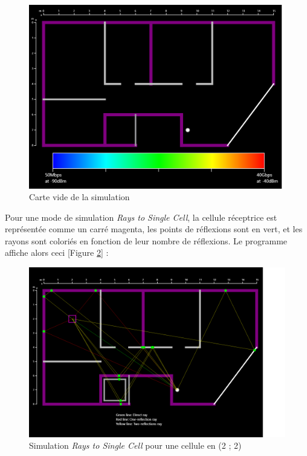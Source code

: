 \begin{figure}[H]
    \centering
    \includegraphics[width=\textwidth]{latex/images/blank_map.png}
    \caption{Carte vide de la simulation}
    \label{fig:blank-map}
\end{figure}

Pour une mode de simulation \textit{Rays to Single Cell}, la cellule réceptrice est représentée comme un carré magenta, les points de réflexions sont en vert, et les rayons sont coloriés en fonction de leur nombre de réflexions. Le programme affiche alors ceci [Figure \ref{fig:simu-single-cell}] :
\begin{figure}[H]
    \centering
    \includegraphics[width=\textwidth]{latex/images/single-cell.png}
    \caption{Simulation \textit{Rays to Single Cell} pour une cellule en (2 ; 2)}
    \label{fig:simu-single-cell}
\end{figure}

